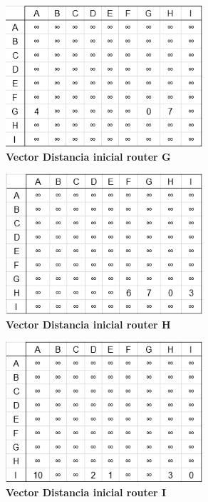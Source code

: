 \documentclass[12pt]{article}
\begin{document}
\begin{figure}[H] 
\centering 
\includegraphics[width=0.65\textwidth]{imagenes/2inicialG.png} \caption{\small \textbf{Vector Distancia inicial router G}}
\label{fig:diagrama_14} 
\end{figure}

\begin{figure}[H] 
\centering 
\includegraphics[width=0.65\textwidth]{imagenes/2inicialH.png} \caption{\small \textbf{Vector Distancia inicial router H}}
\label{fig:diagrama_15} 
\end{figure}

\begin{figure}[H] 
\centering 
\includegraphics[width=0.65\textwidth]{imagenes/2inicialI.png} \caption{\small \textbf{Vector Distancia inicial router I}}
\label{fig:diagrama_16} 
\end{figure}
\end{document}
